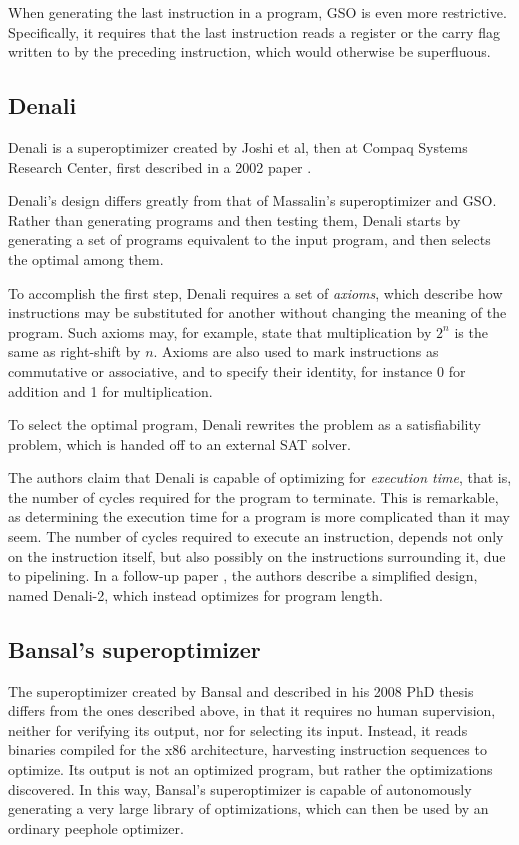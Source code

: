 \documentclass[a4paper,11pt]{kth-mag}
\begin{document}
When generating the last instruction in a program, GSO is even more restrictive.
Specifically, it requires that the last instruction reads a register or the carry flag written to by the preceding instruction, which would otherwise be superfluous.

\subsection{Denali}

Denali is a superoptimizer created by Joshi et al, then at Compaq Systems Research Center, first described in a 2002 paper \cite{joshi02}.

Denali's design differs greatly from that of Massalin's superoptimizer and GSO.
Rather than generating programs and then testing them, Denali starts by generating a set of programs equivalent to the input program, and then selects the optimal among them.

To accomplish the first step, Denali requires a set of \emph{axioms}, which describe how instructions may be substituted for another without changing the meaning of the program.
Such axioms may, for example, state that multiplication by $2^n$ is the same as right-shift by $n$.
Axioms are also used to mark instructions as commutative or associative, and to specify their identity, for instance 0 for addition and 1 for multiplication.

To select the optimal program, Denali rewrites the problem as a satisfiability problem, which is handed off to an external SAT solver.

The authors claim that Denali is capable of optimizing for \emph{execution time}, that is, the number of cycles required for the program to terminate.
This is remarkable, as determining the execution time for a program is more complicated than it may seem.
The number of cycles required to execute an instruction, depends not only on the instruction itself, but also possibly on the instructions surrounding it, due to pipelining.
In a follow-up paper \cite{joshi06}, the authors describe a simplified design, named Denali-2, which instead optimizes for program length.


\subsection{Bansal's superoptimizer}

The superoptimizer created by Bansal and described in his 2008 PhD thesis \cite{bansal_thesis} differs from the ones described above, in that it requires no human supervision, neither for verifying its output, nor for selecting its input.
Instead, it reads binaries compiled for the x86 architecture, harvesting instruction sequences to optimize.
Its output is not an optimized program, but rather the optimizations discovered.
In this way, Bansal's superoptimizer is capable of autonomously generating a very large library of optimizations, which can then be used by an ordinary peephole optimizer.
\end{document}
